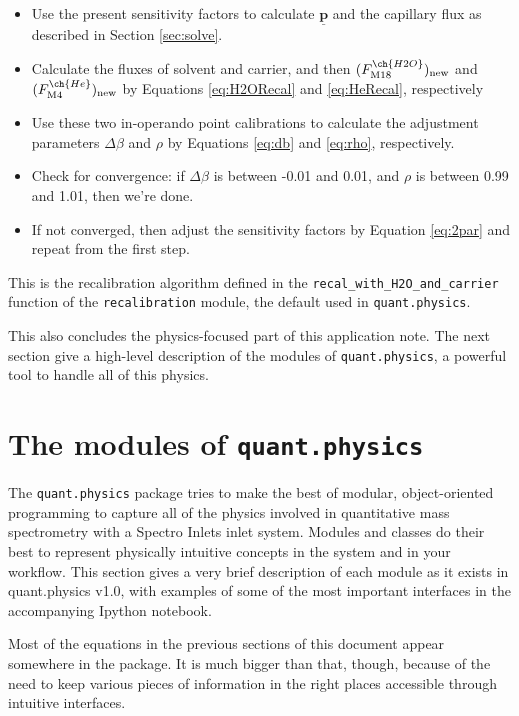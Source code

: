 \documentclass{article}
\newcommand{\code}[1]{\colorbox{codegray}{\lstinline{#1}}}
\renewcommand{\vec}[1]{\underline{\mathbf{#1}}}
\begin{document}
\begin{itemize}
	\item Use the present sensitivity factors to calculate $\vec{p}$ and the capillary flux as described in Section \ref{sec:solve}.
	
	\item Calculate the fluxes of solvent and carrier, and then  $(F^{\ch{H2O}}_\text{M18})_\text{new}$ and $(F^{\ch{He}}_\text{M4})_\text{new}$ by Equations \ref{eq:H2ORecal} and \ref{eq:HeRecal}, respectively 
	
	\item Use these two in-operando point calibrations to calculate the adjustment parameters $\Delta \beta$ and $\rho$ by Equations \ref{eq:db} and \ref{eq:rho}, respectively.
	
	\item Check for convergence: if $\Delta \beta$ is between -0.01 and 0.01, and $\rho$ is between 0.99 and 1.01, then we're done.
	
	\item If not converged, then adjust the sensitivity factors by Equation \ref{eq:2par} and repeat from the first step.
\end{itemize}

This is the recalibration algorithm defined in the \code{recal_with_H2O_and_carrier} function of the \code{recalibration} module, the default used in \code{quant.physics}.

This also concludes the physics-focused part of this application note. The next section give a high-level description of the modules of \code{quant.physics}, a powerful tool to handle all of this physics.

\section{The modules of \code{quant.physics}} \label{sec:modules}

The \code{quant.physics} package tries to make the best of modular, object-oriented programming to capture all of the physics involved in quantitative mass spectrometry with a Spectro Inlets inlet system. Modules and classes do their best to represent physically intuitive concepts in the system and in your workflow. This section gives a very brief description of each module as it exists in quant.physics v1.0, with examples of some of the most important interfaces in the accompanying Ipython notebook. 


Most of the equations in the previous sections of this document appear somewhere in the package. It is much bigger than that, though, because of the need to keep various pieces of information in the right places accessible through intuitive interfaces.
\end{document}
